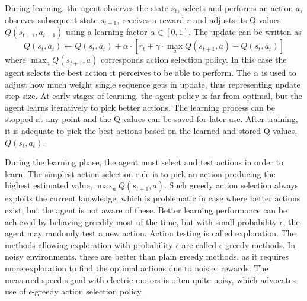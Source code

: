 During learning, the agent observes the state $s_t$, selects and performs an action $a$, observes subsequent state $s_{t+1}$, receives a reward $r$ and adjusts its Q-values $Q(s_{t+1}, a_{t+1})$ using a learning factor $\alpha \in [0, 1]$. The update can be written as \cite{RL:Watkins-Q}
\begin{equation}
    Q(s_t, a_t) \leftarrow Q(s_t, a_t) + \alpha \cdot [r_t + \gamma \cdot \max_{a}Q(s_{t+1}, a) - Q(s_t, a_t)]
    \label{Eq:Q-learning}
\end{equation}
where $\max_{a}Q(s_{t+1}, a)$ corresponds action selection policy. In this case the agent selects the best action it perceives to be able to perform. The $\alpha$ is used to adjust how much weight single sequence gets in update, thus representing update step size. At early stages of learning, the agent policy is far from optimal, but the agent learns iteratively to pick better actions. The learning process can be stopped at any point and the Q-values can be saved for later use. After training, it is adequate to pick the best actions based on the learned and stored Q-values, $Q(s_{t}, a_{t})$.

During the learning phase, the agent must select and test actions in order to learn. The simplest action selection rule is to pick an action producing the highest estimated value, $\max_{a}Q(s_{t+1}, a)$. Such greedy action selection always exploits the current knowledge, which is problematic in case where better actions exist, but the agent is not aware of these. Better learning performance can be achieved by behaving greedily most of the time, but with small probability $\epsilon$, the agent may randomly test a new action. Action testing is called exploration. The methods allowing exploration with probability $\epsilon$ are called $\epsilon$-greedy methods. In noisy environments, these are better than plain greedy methods, as it requires more exploration to find the optimal actions due to noisier rewards. The measured speed signal with electric motors is often quite noisy, which advocates use of $\epsilon$-greedy action selection policy. \cite{RL:Sutton-Barto}

